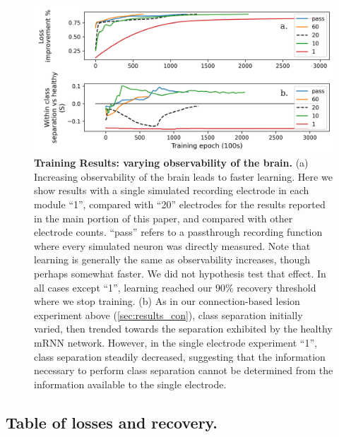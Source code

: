 \documentclass[12pt]{iopart}
\begin{document}
\begin{figure}[h!]
\centering
\includegraphics[scale=0.7]{training_results_observability.png}
\caption{\textbf{Training Results: varying observability of the brain.}
         (a) Increasing observability of the brain leads to faster learning. Here
         we show results with a single simulated recording electrode in each module
         ``1'', compared with ``20'' electrodes for the results reported in the main
         portion of this paper, and compared with other electrode counts. ``pass''
         refers to a passthrough recording function where every simulated neuron was
         directly measured. Note that learning is generally the same as observability
         increases, though perhaps somewhat faster. We did not hypothesis test that effect.
         In all cases except ``1'', learning reached our $90\%$ recovery threshold where
         we stop training. (b) As in our connection-based lesion experiment above
         (\ref{sec:results_con}), class separation initially varied, then trended towards the
         separation exhibited by the healthy mRNN network. However, in
         the single electrode experiment ``1'', class separation steadily decreased, suggesting
         that the information necessary to perform class separation cannot be determined from
         the information available to the single electrode.}
\label{fig:results_observability}
\end{figure}

\subsection{Table of losses and recovery.}
\label{sup:results}
\end{document}
